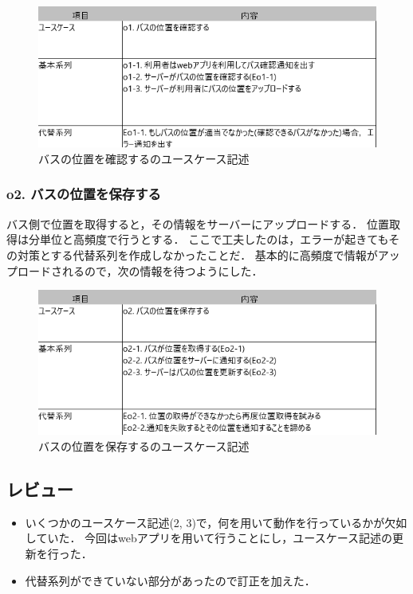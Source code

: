 \documentclass[documentclass]{jsarticle}
\begin{document}
\begin{figure}[H]
  \begin{center}
    \includegraphics*[scale=0.6]{figure/4-7.png}
  \end{center}
  \caption{バスの位置を確認するのユースケース記述}
  \label{fig:4-7}
\end{figure}

\subsubsection*{o2. バスの位置を保存する}
バス側で位置を取得すると，その情報をサーバーにアップロードする．
位置取得は分単位と高頻度で行うとする．
ここで工夫したのは，エラーが起きてもその対策とする代替系列を作成しなかったことだ．
基本的に高頻度で情報がアップロードされるので，次の情報を待つようにした．

\begin{figure}[H]
  \begin{center}
    \includegraphics*[scale=0.6]{figure/4-8.png}
  \end{center}
  \caption{バスの位置を保存するのユースケース記述}
  \label{fig:4-8}
\end{figure}

\subsection*{レビュー}
\begin{itemize}
  \item いくつかのユースケース記述(2, 3)で，何を用いて動作を行っているかが欠如していた．
  今回はwebアプリを用いて行うことにし，ユースケース記述の更新を行った．
  \item 代替系列ができていない部分があったので訂正を加えた．
\end{itemize}
\end{document}
